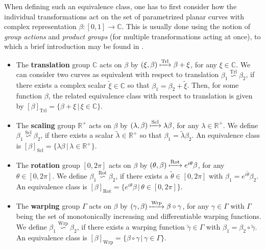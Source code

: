 When defining such an equivalence class, one has to first consider how the individual transformations act on the set of parametrized planar curves with complex representation $\beta : [0,1] \rightarrow \mathbb{C}$.
This is usually done using the notion of \textit{group actions} and \textit{product groups} (for multiple transformations acting at once), to which a brief introduction may be found in \cite[Chap.\ 3]{SrivastavaKlassen2016}.
\begin{itemize}
  \item
    The \textbf{translation} group $\mathbb{C}$ acts on $\beta$ by $(\xi, \beta) \xmapsto{\text{Trl}} \beta + \xi$, for any $\xi \in \mathbb{C}$.
    We can consider two curves as equivalent with respect to translation $\beta_1 \overset{\text{Trl}}{\backsim} \beta_2$, if there exists a complex scalar $\tilde\xi \in \mathbb{C}$ so that $\beta_1 = \beta_2  + \tilde\xi$.
    Then, for some function $\beta$, the related equivalence class with respect to translation is given by $[\beta]_{\text{Trl}} = \{\beta + \xi\, |\, \xi \in \mathbb{C}\}$.
  \item 
    The \textbf{scaling} group $\mathbb{R}^+$ acts on $\beta$ by $(\lambda, \beta) \xmapsto{\text{Scl}} \lambda \beta$, for any $\lambda \in \mathbb{R}^+$.
    We define $\beta_1 \overset{\text{Scl}}{\backsim} \beta_2$, if there exists a scalar $\tilde\lambda \in \mathbb{R}^+$ so that $\beta_1 = \tilde\lambda \beta_2$.
    An equivalence class is $[\beta]_{\text{Scl}} = \{\lambda\beta\,|\, \lambda \in \mathbb{R}^+\}$.
  \item 
    The \textbf{rotation} group $[0,2\pi]$ acts on $\beta$ by $(\theta, \beta) \xmapsto{\text{Rot}}  e^{i\theta} \beta$, for any $\theta \in [0,2\pi]$.
    We define $\beta_1 \overset{\text{Rot}}{\backsim} \beta_2$, if there exists a $\tilde\theta \in [0,2\pi]$ with $\beta_1 = e^{i\tilde\theta} \beta_2$.
    An equivalence class is $[\beta]_{\text{Rot}} = \{e^{i\theta}\beta\,|\, \theta \in [0,2\pi]\}$.
  \item 
    The \textbf{warping} group $\Gamma$ acts on $\beta$ by $(\gamma,\beta) \xmapsto{\text{Wrp}} \beta \circ \gamma$, for any $\gamma \in \Gamma$ with $\Gamma$ being the set of monotonically increasing and differentiable warping functions.
    We define $\beta_1 \overset{\text{Wrp}}{\backsim} \beta_2$, if there exists a warping function $\tilde\gamma \in \Gamma$ with $\beta_1 = \beta_2 \circ \tilde\gamma$.
    An equivalence class is $[\beta]_{\text{Wrp}} = \{\beta \circ \gamma\,|\, \gamma \in \Gamma\}$.
\end{itemize}

